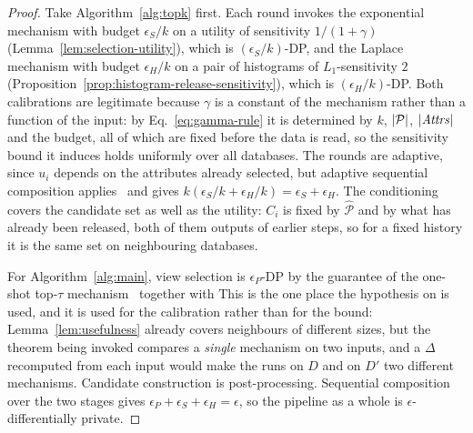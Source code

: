 \begin{proof}
Take Algorithm~\ref{alg:topk} first.
Each round invokes the exponential mechanism with budget $\epsilon_S/k$ on a utility of sensitivity $1/(1+\gamma)$ (Lemma~\ref{lem:selection-utility}), which is $(\epsilon_S/k)$-DP, and the Laplace mechanism with budget $\epsilon_H/k$ on a pair of histograms of $L_1$-sensitivity $2$ (Proposition~\ref{prop:histogram-release-sensitivity}), which is $(\epsilon_H/k)$-DP.
Both calibrations are legitimate because $\gamma$ is a constant of the mechanism rather than a function of the input: by Eq.~\eqref{eq:gamma-rule} it is determined by $k$, $|\mathcal{P}|$, $|\mathit{Attrs}|$ and the budget, all of which are fixed before the data is read, so the sensitivity bound it induces holds uniformly over all databases.
The rounds are adaptive, since $u_i$ depends on the attributes already selected, but adaptive sequential composition applies~\cite{DBLP:series/synthesis/2016Li} and gives $k(\epsilon_S/k+\epsilon_H/k)=\epsilon_S+\epsilon_H$.
The conditioning covers the candidate set as well as the utility: $C_i$ is fixed by $\widehat{\mathcal{P}}$ and by what has already been released, both of them outputs of earlier steps, so for a fixed history it is the same set on neighbouring databases.

For Algorithm~\ref{alg:main}, view selection is $\epsilon_P$-DP by the guarantee of the one-shot top-$\tau$ mechanism~\cite{DurfeeRogers19} together with 
This is the one place the hypothesis on  is used, and it is used for the calibration rather than for the bound: Lemma~\ref{lem:usefulness} already covers neighbours of different sizes, but the theorem being invoked compares a \emph{single} mechanism on two inputs, and a $\Delta$ recomputed from each input would make the runs on $D$ and on $D'$ two different mechanisms.
Candidate construction is post-processing.
Sequential composition over the two stages gives $\epsilon_P+\epsilon_S+\epsilon_H=\epsilon$, so the pipeline as a whole is $\epsilon$-differentially private.
\end{proof}

